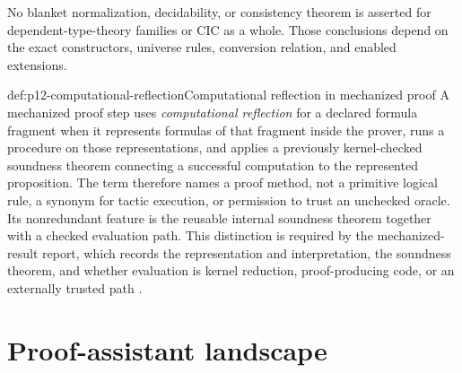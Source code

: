 No blanket normalization, decidability, or consistency theorem is asserted
for dependent-type-theory families or CIC as a whole.  Those conclusions
depend on the exact constructors, universe rules, conversion relation, and
enabled extensions.

\begin{hbdefinition}{def:p12-computational-reflection}{Computational reflection in mechanized proof}
A mechanized proof step uses \emph{computational reflection} for a declared
formula fragment when it represents formulas of that fragment inside the
prover, runs a procedure on those representations, and applies a previously
kernel-checked soundness theorem connecting a successful computation to the
represented proposition.  The term therefore names a proof method, not a
primitive logical rule, a synonym for tactic execution, or permission to trust
an unchecked oracle.  Its nonredundant feature is the reusable internal
soundness theorem together with a checked evaluation path.  This distinction
is required by the mechanized-result report, which records the representation
and interpretation, the soundness theorem, and whether evaluation is kernel
reduction, proof-producing code, or an externally trusted path
\cite{Harrison1995Reflection}.
\end{hbdefinition}



\section{Proof-assistant landscape}

